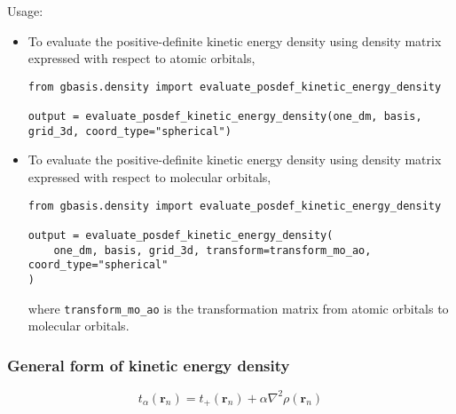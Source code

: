 \documentclass[letterpaper]{article}
\begin{document}
Usage:
\begin{itemize}
\item To evaluate the positive-definite kinetic energy density using density
  matrix expressed with respect to atomic orbitals,
\begin{verbatim}
from gbasis.density import evaluate_posdef_kinetic_energy_density

output = evaluate_posdef_kinetic_energy_density(one_dm, basis, grid_3d, coord_type="spherical")
\end{verbatim}
\item To evaluate the positive-definite kinetic energy density using density
  matrix expressed with respect to molecular orbitals,
\begin{verbatim}
from gbasis.density import evaluate_posdef_kinetic_energy_density

output = evaluate_posdef_kinetic_energy_density(
    one_dm, basis, grid_3d, transform=transform_mo_ao, coord_type="spherical"
)
\end{verbatim}
  where \verb|transform_mo_ao| is the transformation matrix from atomic orbitals
  to molecular orbitals.
\end{itemize}
\subsubsection{General form of kinetic energy density}
\begin{equation}
  t_{\alpha} (\mathbf{r}_n) = t_+(\mathbf{r}_n) + \alpha \nabla^2 \rho(\mathbf{r}_n)
\end{equation}
\end{document}
